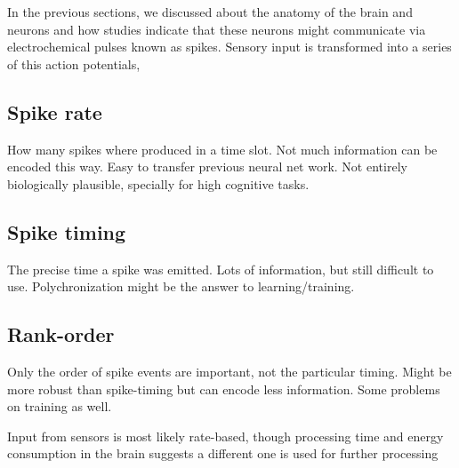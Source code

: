 In the previous sections, we discussed about the anatomy of the brain and neurons and how studies indicate that these neurons might communicate via electrochemical pulses known as spikes. Sensory input is transformed into a series of this action potentials, 

\subsection{Spike rate}
How many spikes where produced in a time slot. Not much information can be encoded this way. Easy to transfer previous neural net work. Not entirely biologically plausible, specially for high cognitive tasks.

\subsection{Spike timing}
The precise time a spike was emitted. Lots of information, but still difficult to use. Polychronization might be the answer to learning/training.

\subsection{Rank-order}
Only the order of spike events are important, not the particular timing. Might be more robust than spike-timing but can encode less information. Some problems on training as well.

Input from sensors is most likely rate-based, though processing time and energy consumption in the brain suggests a different one is used for further processing